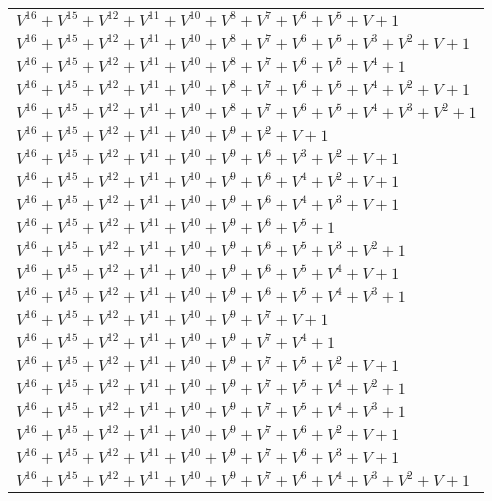 \documentclass[12pt]{article}
\begin{document}
\begin{adjustwidth}{-4cm}{}
\begin{center}
\begin{longtable}{|l|}
$V^{16}  +V^{15}  +V^{12}  +V^{11}  +V^{10}  +V^{8}  +V^{7}  +V^{6}  +V^{5}  + V + 1$ \\
$V^{16}  +V^{15}  +V^{12}  +V^{11}  +V^{10}  +V^{8}  +V^{7}  +V^{6}  +V^{5}  +V^{3}  +V^{2}  + V + 1$ \\
$V^{16}  +V^{15}  +V^{12}  +V^{11}  +V^{10}  +V^{8}  +V^{7}  +V^{6}  +V^{5}  +V^{4}  + 1$ \\
$V^{16}  +V^{15}  +V^{12}  +V^{11}  +V^{10}  +V^{8}  +V^{7}  +V^{6}  +V^{5}  +V^{4}  +V^{2}  + V + 1$ \\
$V^{16}  +V^{15}  +V^{12}  +V^{11}  +V^{10}  +V^{8}  +V^{7}  +V^{6}  +V^{5}  +V^{4}  +V^{3}  +V^{2}  + 1$ \\
$V^{16}  +V^{15}  +V^{12}  +V^{11}  +V^{10}  +V^{9}  +V^{2}  + V + 1$ \\
$V^{16}  +V^{15}  +V^{12}  +V^{11}  +V^{10}  +V^{9}  +V^{6}  +V^{3}  +V^{2}  + V + 1$ \\
$V^{16}  +V^{15}  +V^{12}  +V^{11}  +V^{10}  +V^{9}  +V^{6}  +V^{4}  +V^{2}  + V + 1$ \\
$V^{16}  +V^{15}  +V^{12}  +V^{11}  +V^{10}  +V^{9}  +V^{6}  +V^{4}  +V^{3}  + V + 1$ \\
$V^{16}  +V^{15}  +V^{12}  +V^{11}  +V^{10}  +V^{9}  +V^{6}  +V^{5}  + 1$ \\
$V^{16}  +V^{15}  +V^{12}  +V^{11}  +V^{10}  +V^{9}  +V^{6}  +V^{5}  +V^{3}  +V^{2}  + 1$ \\
$V^{16}  +V^{15}  +V^{12}  +V^{11}  +V^{10}  +V^{9}  +V^{6}  +V^{5}  +V^{4}  + V + 1$ \\
$V^{16}  +V^{15}  +V^{12}  +V^{11}  +V^{10}  +V^{9}  +V^{6}  +V^{5}  +V^{4}  +V^{3}  + 1$ \\
$V^{16}  +V^{15}  +V^{12}  +V^{11}  +V^{10}  +V^{9}  +V^{7}  + V + 1$ \\
$V^{16}  +V^{15}  +V^{12}  +V^{11}  +V^{10}  +V^{9}  +V^{7}  +V^{4}  + 1$ \\
$V^{16}  +V^{15}  +V^{12}  +V^{11}  +V^{10}  +V^{9}  +V^{7}  +V^{5}  +V^{2}  + V + 1$ \\
$V^{16}  +V^{15}  +V^{12}  +V^{11}  +V^{10}  +V^{9}  +V^{7}  +V^{5}  +V^{4}  +V^{2}  + 1$ \\
$V^{16}  +V^{15}  +V^{12}  +V^{11}  +V^{10}  +V^{9}  +V^{7}  +V^{5}  +V^{4}  +V^{3}  + 1$ \\
$V^{16}  +V^{15}  +V^{12}  +V^{11}  +V^{10}  +V^{9}  +V^{7}  +V^{6}  +V^{2}  + V + 1$ \\
$V^{16}  +V^{15}  +V^{12}  +V^{11}  +V^{10}  +V^{9}  +V^{7}  +V^{6}  +V^{3}  + V + 1$ \\
$V^{16}  +V^{15}  +V^{12}  +V^{11}  +V^{10}  +V^{9}  +V^{7}  +V^{6}  +V^{4}  +V^{3}  +V^{2}  + V + 1$ \\

\end{longtable}
\end{center}
\end{adjustwidth}
\end{document}
